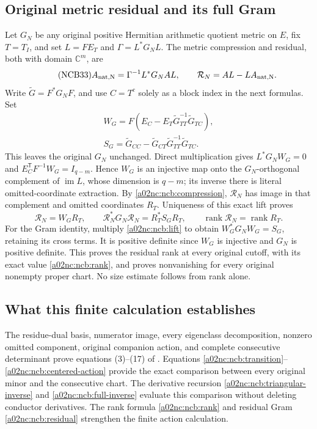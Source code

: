 \subsection{Original metric residual and its full Gram}
Let $G_N$ be any original positive Hermitian arithmetic quotient metric
on $E$, fix $T=T_I$, and set $L=FE_T$ and $\Gamma=L^*G_NL$.
The metric compression and residual, both with domain $\mathbb C^m$,
are
\begin{equation}\tag{NCB33}\label{a02nc:ncb:compression}
A_{\rm nat,N}=\Gamma^{-1}L^*G_NAL,\qquad
\mathcal R_N=AL-LA_{\rm nat,N}.
\end{equation}
Write $\widetilde G=F^*G_NF$, and use $C=T^c$ solely as a block
index in the next formulas. Set
\begin{equation}\tag{NCB34}\label{a02nc:ncb:lift}
\begin{gathered}
W_G=F(E_C-E_T\widetilde G_{TT}^{-1}\widetilde G_{TC}),\\
S_G=\widetilde G_{CC}
 -\widetilde G_{CT}\widetilde G_{TT}^{-1}\widetilde G_{TC}.
\end{gathered}
\end{equation}
This leaves the original $G_N$ unchanged. Direct multiplication gives
$L^*G_NW_G=0$ and $E_C^{\mathsf T}F^{-1}W_G=I_{q-m}$.
Hence $W_G$ is an injective map onto the $G_N$-orthogonal complement
of $\operatorname{im}L$, whose dimension is $q-m$; its inverse there
is literal omitted-coordinate extraction.
By \eqref{a02nc:ncb:compression}, $\mathcal R_N$ has image in that
complement and omitted coordinates $R_T$. Uniqueness of this exact
lift proves
\begin{equation}\tag{NCB35}\label{a02nc:ncb:residual}
\mathcal R_N=W_GR_T,\qquad
\mathcal R_N^*G_N\mathcal R_N=R_T^*S_GR_T,\qquad
\operatorname{rank}\mathcal R_N=\operatorname{rank}R_T .
\end{equation}
For the Gram identity, multiply \eqref{a02nc:ncb:lift} to obtain
$W_G^*G_NW_G=S_G$, retaining its cross terms.
It is positive definite since $W_G$ is injective and $G_N$ is
positive definite. This proves the residual rank at every original
cutoff, with its exact value \eqref{a02nc:ncb:rank}, and proves nonvanishing
for every original nonempty proper chart. No size estimate follows
from rank alone.

\subsection{What this finite calculation establishes}
The residue-dual basis, numerator image, every eigenclass
decomposition, nonzero omitted component, original companion action,
and complete consecutive determinant prove equations (3)--(17) of
\cite{a02nc:prog:arrival02}. Equations
\eqref{a02nc:ncb:transition}--\eqref{a02nc:ncb:centered-action} provide the exact
comparison between every original minor and the consecutive chart.
The derivative recursion \eqref{a02nc:ncb:triangular-inverse} and
\eqref{a02nc:ncb:full-inverse} evaluate this comparison without deleting
conductor derivatives. The rank formula \eqref{a02nc:ncb:rank} and residual
Gram \eqref{a02nc:ncb:residual} strengthen the finite action calculation.

